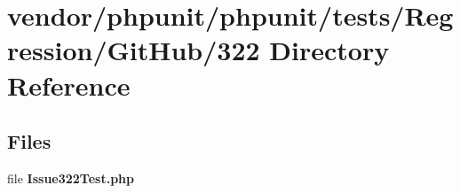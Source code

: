 \section{vendor/phpunit/phpunit/tests/\+Regression/\+Git\+Hub/322 Directory Reference}
\label{dir_e60d10da72dc0acde1a7805a47304505}
\subsection*{Files}
\begin{DoxyCompactItemize}
\item 
file {\bf Issue322\+Test.\+php}
\end{DoxyCompactItemize}
